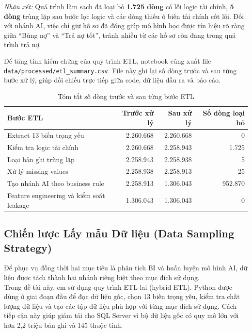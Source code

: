 \textit{Nhận xét:} Quá trình làm sạch đã loại bỏ \textbf{1.725 dòng} có lỗi logic tài chính, \textbf{5 dòng} trùng lặp sau bước lọc logic và các dòng thiếu ở biến tài chính cốt lõi. Đối với nhánh AI, việc chỉ giữ hồ sơ đã đóng giúp mô hình học được tín hiệu rõ ràng giữa ``Bùng nợ'' và ``Trả nợ tốt'', tránh nhiễu từ các hồ sơ còn đang trong quá trình trả nợ.

Để tăng tính kiểm chứng của quy trình ETL, notebook cũng xuất file \texttt{data/processed/etl\_summary.csv}. File này ghi lại số dòng trước và sau từng bước xử lý, giúp đối chiếu trực tiếp giữa code, dữ liệu đầu ra và báo cáo.

\begin{table}[H]
    \centering
    \renewcommand{\arraystretch}{1.2}
    \begin{tabular}{|l|r|r|r|}
        \hline
        \textbf{Bước ETL} & \textbf{Trước xử lý} & \textbf{Sau xử lý} & \textbf{Số dòng loại bỏ} \\ \hline
        Extract 13 biến trọng yếu & 2.260.668 & 2.260.668 & 0 \\ \hline
        Kiểm tra logic tài chính & 2.260.668 & 2.258.943 & 1.725 \\ \hline
        Loại bản ghi trùng lặp & 2.258.943 & 2.258.938 & 5 \\ \hline
        Xử lý missing values & 2.258.938 & 2.258.913 & 25 \\ \hline
        Tạo nhánh AI theo business rule & 2.258.913 & 1.306.043 & 952.870 \\ \hline
        Feature engineering và kiểm soát leakage & 1.306.043 & 1.306.043 & 0 \\ \hline
    \end{tabular}
    \caption{Tóm tắt số dòng trước và sau từng bước ETL}
    \label{tab:etl_summary}
\end{table}

\subsection{Chiến lược Lấy mẫu Dữ liệu (Data Sampling Strategy)}

Để phục vụ đồng thời hai mục tiêu là phân tích BI và huấn luyện mô hình AI, dữ liệu được tách thành hai nhánh riêng biệt theo mục đích sử dụng.\\
Trong đề tài này, em sử dụng quy trình ETL lai (hybrid ETL). Python được dùng ở giai đoạn đầu để đọc dữ liệu gốc, chọn 13 biến trọng yếu, kiểm tra chất lượng dữ liệu và tạo các tập dữ liệu phù hợp với từng mục đích sử dụng. Cách tiếp cận này giúp giảm tải cho SQL Server vì bộ dữ liệu gốc có quy mô lớn với hơn 2,2 triệu bản ghi và 145 thuộc tính.

